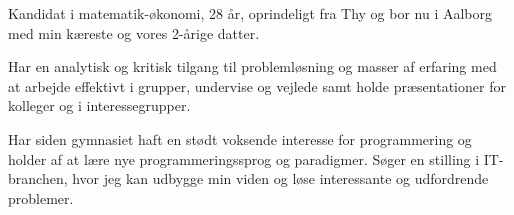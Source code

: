 \documentclass[9pt]{template/developercv}
\begin{document}
\begin{minipage}[t]{0.5\textwidth}
  \vspace{-\baselineskip}

  Kandidat i matematik-økonomi, 28 år, oprindeligt fra Thy og bor nu i Aalborg med min kæreste og vores 2-årige datter.

  \medskip
  Har en analytisk og kritisk tilgang til problemløsning og masser af erfaring med at arbejde effektivt i grupper, undervise og vejlede samt holde præsentationer for kolleger og i interessegrupper.

  \medskip
  Har siden gymnasiet haft en stødt voksende interesse for programmering og holder af at lære nye programmeringssprog og paradigmer.
  Søger en stilling i IT-branchen, hvor jeg kan udbygge min viden og løse interessante og udfordrende problemer.

\end{minipage}
\hfill
\begin{minipage}[t]{0.23\textwidth}
  \vspace{-\baselineskip}
  \begin{barchart}{2.5}
  \end{barchart}
\end{minipage}
\hfill
\begin{minipage}[t]{0.17\textwidth}
  \vspace{-\baselineskip}
  \begin{barchart}{2.5}
  \end{barchart}
\end{minipage}

\begin{center}
\end{center}
\end{document}
